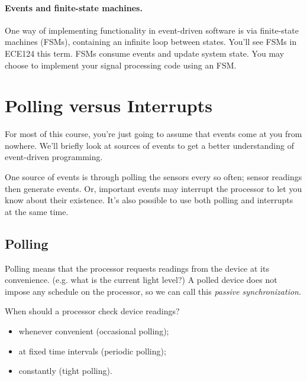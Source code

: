 \paragraph{Events and finite-state machines.}
One way of implementing functionality in  event-driven software is via finite-state
machines (FSMs), containing an infinite loop between states. You'll
see FSMs in ECE124 this term. FSMs consume events and update system
state. You may choose to implement your signal processing code using an FSM.





\section*{Polling versus Interrupts}
For most of this course, you're just going to assume that events
come at you from nowhere. We'll briefly look at sources
of events to get a better understanding of event-driven
programming.

One source of events is through polling the sensors every so often; 
sensor readings then generate events.  Or, important events may
interrupt the processor to let you know about their existence.
It's also possible to use both polling and interrupts at the same time.

\subsection*{Polling} Polling means that the processor requests readings from
the device at its convenience. (e.g. what is the current light level?)
A polled device does not impose any schedule on the processor, so we
can call this \emph{passive synchronization}.


\noindent
When should a processor check device readings?

\begin{itemize}
\item whenever convenient (occasional polling);
\item at fixed time intervals (periodic polling);
\item constantly (tight polling).
\end{itemize}

